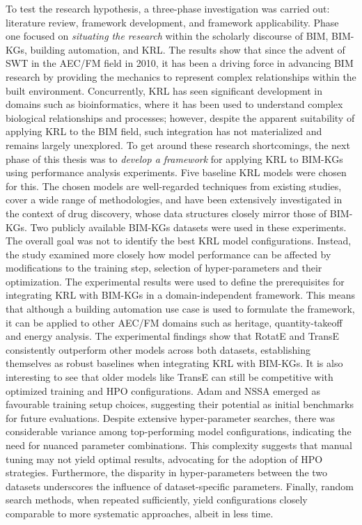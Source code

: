 To test the research hypothesis, a three-phase investigation was carried out: literature review, framework development, and framework applicability. Phase one focused on \textit{situating the research} within the scholarly discourse of \ac{BIM}, \acp{BIM-KG}, building automation, and \ac{KRL}. The results show that since the advent of \ac{SWT} in the \ac{AEC/FM} field in 2010, it has been a driving force in advancing \ac{BIM} research by providing the mechanics to represent complex relationships within the built environment. Concurrently, \ac{KRL} has seen significant development in domains such as bioinformatics, where it has been used to understand complex biological relationships and processes; however, despite the apparent suitability of applying \ac{KRL} to the \ac{BIM} field, such integration has not materialized and remains largely unexplored. To get around these research shortcomings, the next phase of this thesis was to \textit{develop a framework} for applying \ac{KRL} to \acp{BIM-KG} using performance analysis experiments. Five baseline \ac{KRL} models were chosen for this. The chosen models are well-regarded techniques from existing studies, cover a wide range of methodologies, and have been extensively investigated in the context of drug discovery, whose data structures closely mirror those of \acp{BIM-KG}. Two publicly available \acp{BIM-KG} datasets were used in these experiments. The overall goal was not to identify the best \ac{KRL} model configurations. Instead, the study examined more closely how model performance can be affected by modifications to the training step, selection of hyper-parameters and their optimization. The experimental results were used to define the prerequisites for integrating \ac{KRL} with \acp{BIM-KG} in a domain-independent framework.
This means that although a building automation use case is used to formulate the framework, it can be applied to other \ac{AEC/FM} domains such as heritage, quantity-takeoff and energy analysis. The experimental findings show that RotatE and TransE consistently outperform other models across both datasets, establishing themselves as robust baselines when integrating \ac{KRL} with \acp{BIM-KG}. It is also interesting to see that older models like TransE can still be competitive with optimized training and \ac{HPO} configurations. Adam and NSSA emerged as favourable training setup choices, suggesting their potential as initial benchmarks for future evaluations. Despite extensive hyper-parameter searches, there was considerable variance among top-performing model configurations, indicating the need for nuanced parameter combinations. This complexity suggests that manual tuning may not yield optimal results, advocating for the adoption of \ac{HPO} strategies. Furthermore, the disparity in hyper-parameters between the two datasets underscores the influence of dataset-specific parameters. Finally, random search methods, when repeated sufficiently, yield configurations closely comparable to more systematic approaches, albeit in less time.

